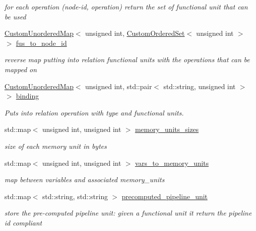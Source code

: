 \begin{DoxyCompactItemize}
\begin{DoxyCompactList}\small\item\em for each operation (node-\/id, operation) return the set of functional unit that can be used \end{DoxyCompactList}\item 
\hyperlink{custom__map_8hpp_ad1ed68f2ff093683ab1a33522b144adc}{Custom\+Unordered\+Map}$<$ unsigned int, \hyperlink{classCustomOrderedSet}{Custom\+Ordered\+Set}$<$ unsigned int $>$ $>$ \hyperlink{classAllocationInformation_a5dbaa902da34e4caa37df673e7896da7}{fus\+\_\+to\+\_\+node\+\_\+id}
\begin{DoxyCompactList}\small\item\em reverse map putting into relation functional units with the operations that can be mapped on \end{DoxyCompactList}\item 
\hyperlink{custom__map_8hpp_ad1ed68f2ff093683ab1a33522b144adc}{Custom\+Unordered\+Map}$<$ unsigned int, std\+::pair$<$ std\+::string, unsigned int $>$ $>$ \hyperlink{classAllocationInformation_af42e9cc6ab7f4d1c743d52e59177e480}{binding}
\begin{DoxyCompactList}\small\item\em Puts into relation operation with type and functional units. \end{DoxyCompactList}\item 
std\+::map$<$ unsigned int, unsigned int $>$ \hyperlink{classAllocationInformation_a23448182d9e31c4c02422c3df96eb536}{memory\+\_\+units\+\_\+sizes}
\begin{DoxyCompactList}\small\item\em size of each memory unit in bytes \end{DoxyCompactList}\item 
std\+::map$<$ unsigned int, unsigned int $>$ \hyperlink{classAllocationInformation_ae17eab4836b6c9e353838603563b2be9}{vars\+\_\+to\+\_\+memory\+\_\+units}
\begin{DoxyCompactList}\small\item\em map between variables and associated memory\+\_\+units \end{DoxyCompactList}\item 
std\+::map$<$ std\+::string, std\+::string $>$ \hyperlink{classAllocationInformation_a2c6f950e765b8c39463d3fe03cdad3f3}{precomputed\+\_\+pipeline\+\_\+unit}
\begin{DoxyCompactList}\small\item\em store the pre-\/computed pipeline unit\+: given a functional unit it return the pipeline id compliant \end{DoxyCompactList}\item 

\end{DoxyCompactItemize}
